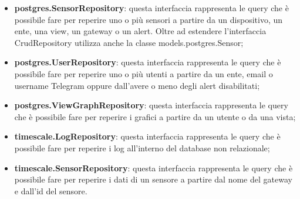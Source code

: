 \begin{landscape}
\begin{itemize}
			\item \textbf{postgres.SensorRepository}: questa interfaccia rappresenta le query che è possibile fare per reperire uno o più sensori a partire da un dispositivo, un ente, una view, un gateway o un alert. Oltre ad estendere l'interfaccia CrudRepository utilizza anche la classe models.postgres.Sensor;
			\item \textbf{postgres.UserRepository}: questa interfaccia rappresenta le query che è possibile fare per reperire uno o più utenti a partire da un ente, email o username Telegram oppure dall'avere o meno degli alert disabilitati;
			\item \textbf{postgres.ViewGraphRepository}: questa interfaccia rappresenta le query che è possibile fare per reperire i grafici a partire da un utente o da una vista;
			\item \textbf{timescale.LogRepository}: questa interfaccia rappresenta le query che è possibile fare per reperire i log all'interno del database non relazionale;
			\item \textbf{timescale.SensorRepository}: questa interfaccia rappresenta le query che è possibile fare per reperire i dati di un sensore a partire dal nome del gateway e dall'id del sensore.
		\end{itemize}

\end{landscape}
